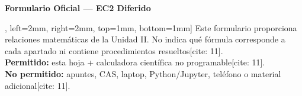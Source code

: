 \documentclass[10pt, a4paper]{article}
\begin{document}
\begin{center}
    \Large\textbf{\textcolor{ucbblue}{Formulario Oficial — EC2 Diferido}}\\[0.2cm]
\end{center}

\begin{tcolorbox}[colback=yellow!10, colframe=black, title=\textbf{Aviso y Reglas de Uso}[cite: 11], left=2mm, right=2mm, top=1mm, bottom=1mm]
    \small
    Este formulario proporciona relaciones matemáticas de la Unidad II. No indica qué fórmula corresponde a cada apartado ni contiene procedimientos resueltos[cite: 11]. \\
    \textbf{Permitido:} esta hoja + calculadora científica no programable[cite: 11]. \\
    \textbf{No permitido:} apuntes, CAS, laptop, Python/Jupyter, teléfono o material adicional[cite: 11].
\end{tcolorbox}
\end{document}
